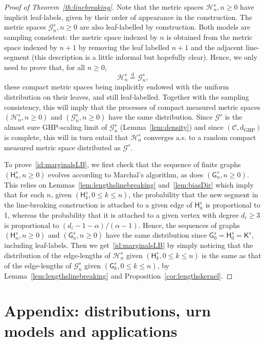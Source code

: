 \documentclass[AHL,Unicode,longabstracts,published]{cedram}
\newcommand{\GHP}{\mathrm{GHP}}
\newcommand{\rmd}{\mathrm{d}}
\newcommand{\cG}{\mathcal{G}}
\newcommand{\cH}{\mathcal{H}}
\newcommand{\sG}{\mathsf{G}}
\newcommand{\sK}{\mathsf{K}}
\newcommand{\sH}{\mathsf{H}}
\newcommand{\scrC}{\mathscr{C}}
\begin{document}
\begin{proof}[Proof of Theorem~\ref{th:linebreaking}]
Note that the metric spaces $\cH^s_n,n\geq 0$ have implicit leaf-labels, given by their order of appearance in the construction. The metric spaces $\cG^s_n,n\geq 0$ are also leaf-labelled by construction. Both models are sampling consistent: the metric space indexed by $n$ is obtained from the metric space indexed by $n+1$ by removing the leaf labelled $n+1$ and the adjacent line-segment (this description is a little informal but hopefully clear). Hence, we only need to prove that, for all $n \geq 0$,
\begin{equation}\label{id:marginalsLB}
\cH^s_n \overset{\rmd}= {\cG}^s_n,
\end{equation}
these compact metric spaces being implicitly endowed with the uniform distribution on their leaves, and still leaf-labelled. Together with the sampling consistency, this will imply that the processes of compact measured metric spaces $(\cH^s_n,n\geq 0)$ and $(\cG^s_n,n\geq 0)$ have the same distribution. Since $\cG^s$ is the almost sure GHP-scaling limit of $\cG^s_n$ (Lemma~\ref{lem:density}) and since $(\scrC,\rmd_{\GHP})$ is complete, this will in turn entail that $\cH^s_n$ converges a.s. to a random compact measured metric space distributed as $\cG^s$.

To prove~\eqref{id:marginalsLB}, we first check that the sequence of finite graphs $(\sH^s_n,n\geq 0)$ evolves according to Marchal's algorithm, as does $(\sG^s_n,n\geq 0)$. This relies on Lemmas~\ref{lem:lengthslinebreaking} and~\ref{lem:biasDir} which imply that for each $n$, given $(\sH^s_k, 0\leq k \leq n)$, the probability that the new segment in the line-breaking construction is attached to a given edge of $\sH^s_n$ is proportional to 1, whereas the probability that it is attached to a given vertex with degree $d_i\geq 3$ is proportional to $(d_i-1-\alpha)/(\alpha-1)$. Hence, the sequences of graphs $(\sH^s_n,n \geq 0)$ and $({\sG}^s_n, n \geq 0)$ have the same distribution since $\sG_0^s=\sH_0^s=\sK^s$, including leaf-labels. Then we get~\eqref{id:marginalsLB} by simply noticing that the distribution of the edge-lengths of $\cH^s_n$ given $(\sH^s_k,0\leq k \leq n)$ is the same as that of the edge-lengths of ${\cG}^s_n$ given $(\sG^s_k,0\leq k \leq n)$, by Lemma~\ref{lem:lengthslinebreaking} and Proposition~\ref{cor:lengthskernel}.
\end{proof}

\section{Appendix: distributions, urn models and applications}\label{sec:urns}
\end{document}
